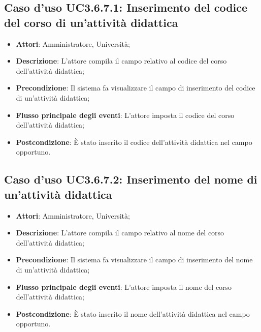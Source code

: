 \subsection{Caso d'uso \texorpdfstring{UC3.6.7.1}{UC3.6.7.1}: Inserimento del codice del corso di un'attività didattica}
\begin{itemize}
	\item \textbf{Attori}: Amministratore, Università;
	\item \textbf{Descrizione}: L'attore compila il campo relativo al codice del corso dell'attività didattica;
	
	\item \textbf{Precondizione}: Il sistema fa visualizzare il campo di inserimento del codice di un'attività didattica;
	
	\item \textbf{Flusso principale degli eventi}: L'attore imposta il codice del corso dell'attività didattica;
	
	\item \textbf{Postcondizione}: È stato inserito il codice dell'attività didattica nel campo opportuno.
	
\end{itemize}
\subsection{Caso d'uso \texorpdfstring{UC3.6.7.2}{UC3.6.7.2}: Inserimento del nome di un’attività didattica}
\begin{itemize}
	\item \textbf{Attori}: Amministratore, Università;
	\item \textbf{Descrizione}: L'attore compila il campo relativo al nome del corso dell'attività didattica;
	
	\item \textbf{Precondizione}: Il sistema fa visualizzare il campo di inserimento del nome di un'attività didattica;
	
	\item \textbf{Flusso principale degli eventi}: L'attore imposta il nome del corso dell'attività didattica;
	
	\item \textbf{Postcondizione}: È stato inserito il nome dell'attività didattica nel campo opportuno.
\end{itemize}
